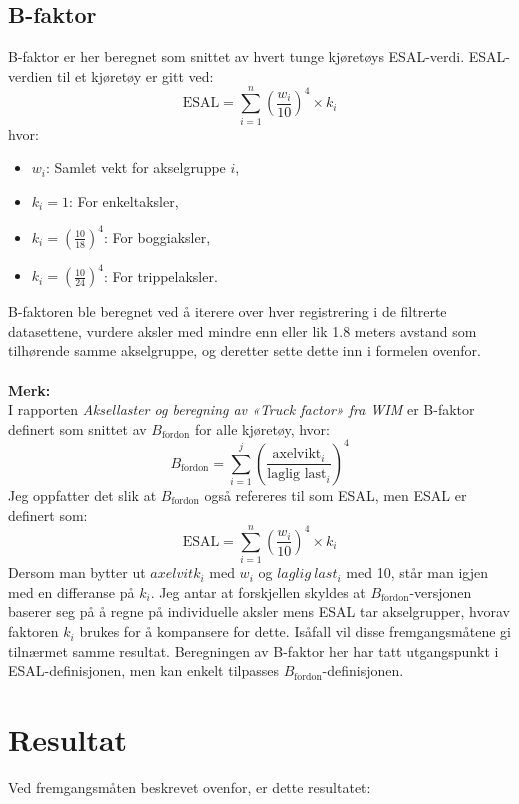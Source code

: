 \subsection{B-faktor}
B-faktor er her beregnet som snittet av hvert tunge kjøretøys ESAL-verdi. ESAL-verdien til et kjøretøy er gitt ved:
\[
\text{ESAL} = \sum_{i=1}^{n} \left(\frac{w_i}{10}\right)^4 \times k_i
\]
hvor:
\begin{itemize}
    \item \(w_i\): Samlet vekt for akselgruppe \(i\),
    \item \(k_i = 1\): For enkeltaksler,
    \item \(k_i = \left(\frac{10}{18}\right)^4\): For boggiaksler,
    \item \(k_i = \left(\frac{10}{24}\right)^4\): For trippelaksler.
\end{itemize}
B-faktoren ble beregnet ved å iterere over hver registrering i de filtrerte datasettene, vurdere aksler med mindre enn eller lik 1.8 meters avstand som tilhørende samme akselgruppe, og deretter sette dette inn i formelen ovenfor.
\\\\\textbf{Merk:} \\
I rapporten \textit{Aksellaster og beregning av «Truck factor» fra WIM} er B-faktor definert som snittet av \(B_{\text{fordon}}\) for alle kjøretøy, hvor:
\[
B_{\text{fordon}} = \sum_{i=1}^{j} \left(\frac{\text{axelvikt}_i}{\text{laglig last}_i}\right)^4
\]
Jeg oppfatter det slik at \(B_{\text{fordon}}\) også refereres til som ESAL, men ESAL er definert som:
\[
\text{ESAL} = \sum_{i=1}^{n} \left(\frac{w_i}{10}\right)^4 \times k_i
\]
Dersom man bytter ut $axelvitk_i$ med \(w_i\) og $laglig\:last_i$ med 10, står man igjen med en differanse på \(k_i\).
Jeg antar at forskjellen skyldes at \(B_{\text{fordon}}\)-versjonen baserer seg på å regne på individuelle aksler mens ESAL tar akselgrupper, 
hvorav faktoren $k_i$ brukes for å kompansere for dette. Isåfall vil disse fremgangsmåtene gi tilnærmet samme resultat.
Beregningen av B-faktor her har tatt utgangspunkt i ESAL-definisjonen, men kan enkelt tilpasses \(B_{\text{fordon}}\)-definisjonen.

\section{Resultat}
Ved fremgangsmåten beskrevet ovenfor, er dette resultatet:

